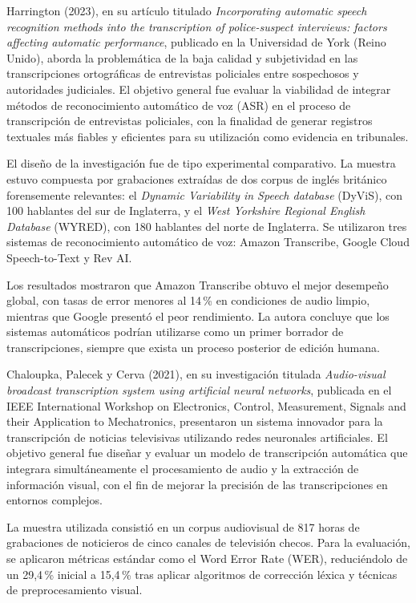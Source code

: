 \documentclass[12pt,a4paper,oneside]{report}
\begin{document}
Harrington (2023), en su artículo titulado \textit{Incorporating automatic speech recognition methods into the transcription of police-suspect interviews: factors affecting automatic performance}, publicado en la Universidad de York (Reino Unido), aborda la problemática de la baja calidad y subjetividad en las transcripciones ortográficas de entrevistas policiales entre sospechosos y autoridades judiciales. El objetivo general fue evaluar la viabilidad de integrar métodos de reconocimiento automático de voz (ASR) en el proceso de transcripción de entrevistas policiales, con la finalidad de generar registros textuales más fiables y eficientes para su utilización como evidencia en tribunales.

El diseño de la investigación fue de tipo experimental comparativo. La muestra estuvo compuesta por grabaciones extraídas de dos corpus de inglés británico forensemente relevantes: el \textit{Dynamic Variability in Speech database} (DyViS), con 100 hablantes del sur de Inglaterra, y el \textit{West Yorkshire Regional English Database} (WYRED), con 180 hablantes del norte de Inglaterra. Se utilizaron tres sistemas de reconocimiento automático de voz: Amazon Transcribe, Google Cloud Speech-to-Text y Rev AI.

Los resultados mostraron que Amazon Transcribe obtuvo el mejor desempeño global, con tasas de error menores al 14\,\% en condiciones de audio limpio, mientras que Google presentó el peor rendimiento. La autora concluye que los sistemas automáticos podrían utilizarse como un primer borrador de transcripciones, siempre que exista un proceso posterior de edición humana.

Chaloupka, Palecek y Cerva (2021), en su investigación titulada \textit{Audio-visual broadcast transcription system using artificial neural networks}, publicada en el IEEE International Workshop on Electronics, Control, Measurement, Signals and their Application to Mechatronics, presentaron un sistema innovador para la transcripción de noticias televisivas utilizando redes neuronales artificiales. El objetivo general fue diseñar y evaluar un modelo de transcripción automática que integrara simultáneamente el procesamiento de audio y la extracción de información visual, con el fin de mejorar la precisión de las transcripciones en entornos complejos.

La muestra utilizada consistió en un corpus audiovisual de 817 horas de grabaciones de noticieros de cinco canales de televisión checos. Para la evaluación, se aplicaron métricas estándar como el Word Error Rate (WER), reduciéndolo de un 29,4\,\% inicial a 15,4\,\% tras aplicar algoritmos de corrección léxica y técnicas de preprocesamiento visual.
\end{document}
